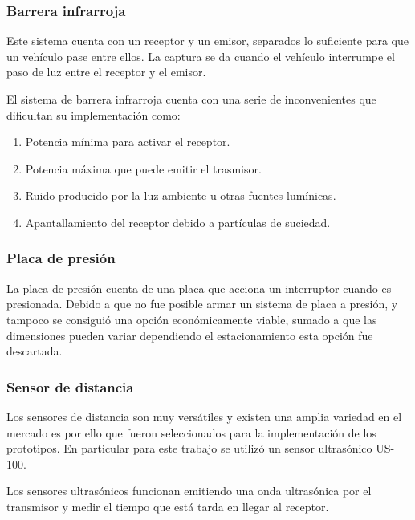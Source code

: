 \subsubsection*{Barrera infrarroja}

Este sistema cuenta con un receptor y un emisor, separados lo suficiente para que un vehículo pase entre ellos. La captura se da cuando el vehículo interrumpe el paso de luz entre el receptor y el emisor.

El sistema de barrera infrarroja cuenta con una serie de inconvenientes que dificultan su implementación como:

\begin{enumerate}
    \item Potencia mínima para activar el receptor.
    \item Potencia máxima que puede emitir el trasmisor.
    \item Ruido producido por la luz ambiente u otras fuentes lumínicas.
    \item Apantallamiento del receptor debido a partículas de suciedad.
\end{enumerate}

\subsubsection*{Placa de presión}

La placa de presión cuenta de una placa que acciona un interruptor cuando es presionada. Debido a que no fue posible armar un sistema de placa a presión, y tampoco se consiguió una opción económicamente viable, sumado a que las dimensiones pueden variar dependiendo el estacionamiento esta opción fue descartada.

\subsubsection*{Sensor de distancia}

Los sensores de distancia son muy versátiles y existen una amplia variedad en el mercado es por ello que fueron seleccionados para la implementación de los prototipos.
En particular para este trabajo se utilizó un sensor ultrasónico US-100.

Los sensores ultrasónicos funcionan emitiendo una onda ultrasónica por el transmisor y medir el tiempo que está tarda en llegar al receptor.

